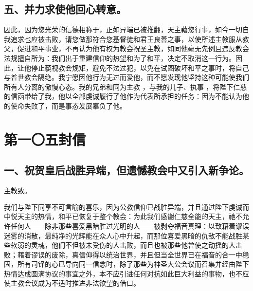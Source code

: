 \subsection{五、并力求使他回心转意。}

因此，因为您光荣的信德相称于，正如异端已被推翻，天主藉您行事，如今一切自我追求也应被击败，请您做那符合您基督徒和君王良善之事，以使所述主教服从教父，促进和平事业，不再认为他有权为教会祝圣主教，如同他毫无先例且违反教会法规擅自所为：我们出于重建信仰的热望和为了和平，决定不取消这一行为。因此，让他停止藐视教会规矩，避免不法过犯，以免在试图破坏和平之事时，将自己与普世教会隔绝。我宁愿因他行为无过而爱他，而不愿发现他坚持这种可能使我们所有人分离的傲慢心态。我的兄弟和同为主教 ，与我的儿子、执事 ，将陛下仁慈的信函带给了我，他以全部虔诚履行了他作为代表所承担的任务：因为不能认为他的使命失败了，而是事态发展辜负了他。\par



\section{第一〇五封信}

\par


\subsection{一、祝贺皇后战胜异端，但遗憾教会中又引入新争论。}

主教致。\par

我们与陛下同享不可言喻的喜乐，因为公教信仰已战胜异端，并且通过陛下虔诚而中悦天主的热情，和平已恢复于整个教会：为此我们感谢仁慈全能的天主，祂不允许任何人——除非那些喜爱黑暗胜过光明的人——被剥夺福音真理：以致藉着谬误迷雾的消散，最纯净的光辉能在众人心中升起，而那位喜爱黑暗的仇敌不能战胜某些软弱的灵魂，他们不但被未受伤的人击败，而且也被那些他曾使之动摇的人击败；藉着谬误的废除，真信仰得以统治世界，并且但当全世界已在福音的合一中稳固，所有司铎的心已导向同一信念时，除了那些为神圣大公会议而召集并经由陛下热情达成圆满协议的事宜之外，本不应引进任何对抗如此巨大利益的事物，也不应使主教会议成为不适时推进非法欲望的借口。\par

